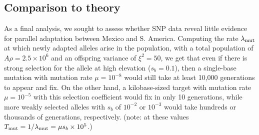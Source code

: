 {{%



\subsection*{Comparison to theory}


As a final analysis, we sought to assess whether  SNP data reveal little evidence for parallel adaptation between Mexico and S. America. Computing the rate $\lambda_{\text{mut}}$ at which newly adapted alleles arise in the population,
with a total population of $A \rho = 2.5 \times 10^6$ and an offspring variance of $\xi^2 = 50$,
we get that even if there is strong selection for the allele at high elevation ($s_b=0.1$),
then a single-base mutation with mutation rate $\mu=10^{-8}$ would still take at least 10,000 generations to appear and fix.
On the other hand, a kilobase-sized target with mutation rate $\mu=10^{-5}$
with this selection coefficient would fix in only 10 generations,
while more weakly selected alleles with $s_b$ of $10^{-2}$ or $10^{-3}$ would take hundreds or thousands of generations, respectively.
(note: at these values $T_{\text{mut}} = 1/\lambda_{\text{mut}} = \mu s_b \times 10^5$.)


}}
